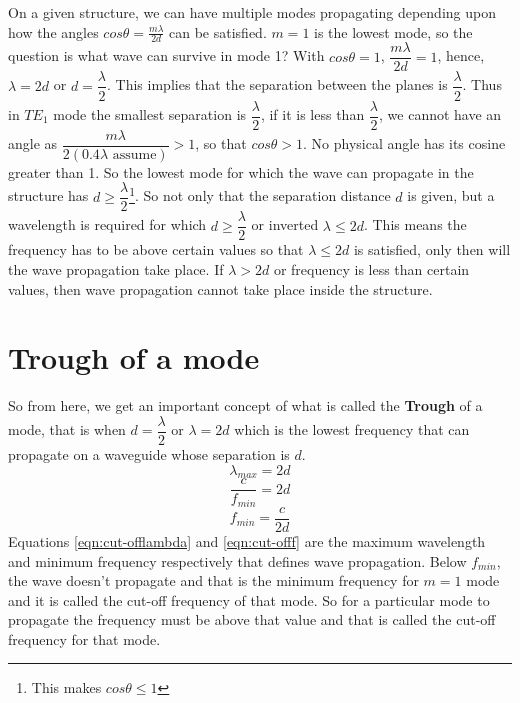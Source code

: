 On a given structure, we can have multiple modes propagating depending upon how the angles $cos\theta = \frac{m\lambda}{2d}$ can be satisfied. $m=1$ is the lowest mode, so the question is what wave can survive in mode 1? With $cos\theta = 1$, $\dfrac{m\lambda}{2d} = 1$, hence, $\lambda = 2d$ or $d = \dfrac{\lambda}{2}$. This implies that the separation between the planes is $\dfrac{\lambda}{2}$. Thus in $TE_1$ mode the smallest separation is $\dfrac{\lambda}{2}$, if it is less than $\dfrac{\lambda}{2}$, we cannot have an angle as $\dfrac{m\lambda}{2(0.4\lambda \text{ assume})}> 1$, so that $cos\theta > 1$. No physical angle has its cosine greater than 1. So the lowest mode for which the wave can propagate in the structure has $d \geq \dfrac{\lambda}{2}$\footnote{This makes $cos\theta \leq 1$}. So not only that the separation distance $d$ is given, but a wavelength is required for which $d\geq\dfrac{\lambda}{2}$ or inverted $\lambda \leq 2d$. This means the frequency has to be above certain values so that $\lambda \leq 2d$ is satisfied, only then will the wave propagation take place. If $\lambda > 2d$ or frequency is less than certain values, then wave propagation cannot take place inside the structure.

\section{Trough of a mode}
 So from here, we get an important concept of what is called the \textbf{Trough} of a mode, that is when $d = \dfrac{\lambda}{2}$ or $\lambda = 2d$ which is the lowest frequency that can propagate on a waveguide whose separation is $d$.
\begin{dmath}
\lambda_{max} = 2d
\label{eqn:cut-offlambda}
\end{dmath}
\begin{dmath*}
\frac{c}{f_{min}} = 2d
\end{dmath*}
\begin{dmath}
f_{min} = \frac{c}{2d}
\label{eqn:cut-offf}
\end{dmath}
Equations \ref{eqn:cut-offlambda} and \ref{eqn:cut-offf} are the maximum wavelength and minimum frequency respectively that defines wave propagation. Below $f_{min}$, the wave doesn't propagate and that is the minimum frequency for $m=1$ mode and it is called the cut-off frequency of that mode. So for a particular mode to propagate the frequency must be above that value and that is called the cut-off frequency for that mode.

